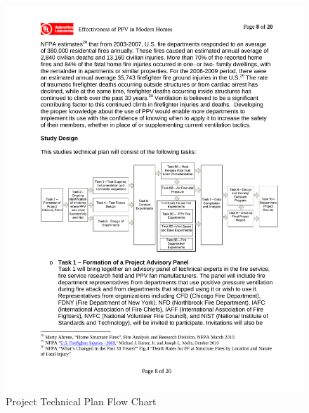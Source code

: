\documentclass{article}
\begin{document}
\begin{figure}[H]
	\centering
	\includegraphics[width = 6in]{0_Images/Objectives_and_Technical_Plan/DHS2012_TechnicalPlan_FlowChart.pdf}
	\caption{Project Technical Plan Flow Chart}
	\label{fig:TechPlanChart}
\end{figure}
\end{document}
